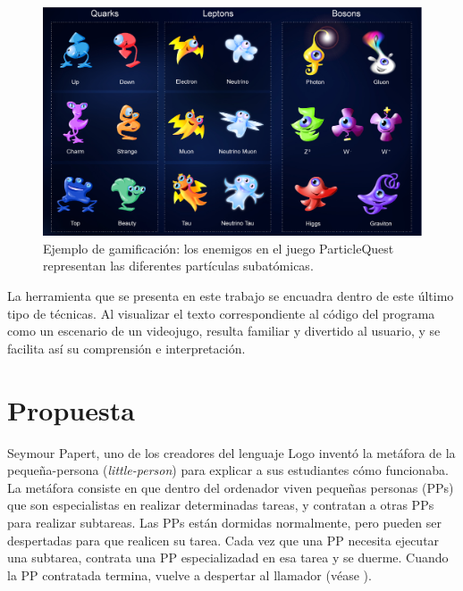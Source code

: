 \documentclass{llncs}
\begin{document}
\begin{figure}[ht]
\begin{center}
\includegraphics[scale=0.3]{images/particlequest.eps}
\caption{Ejemplo de gamificación: los enemigos en el juego ParticleQuest representan las diferentes partículas subatómicas.
\label{fig:particlequest}}
\end{center}
\end{figure}

La herramienta que se presenta en este trabajo se encuadra dentro de este último tipo de técnicas. Al visualizar el texto correspondiente al código del programa como un escenario de un videojugo, resulta familiar y divertido al usuario, y se facilita así su comprensión e interpretación.




\section{Propuesta}
\label{sec:proposal}

Seymour Papert, uno de los creadores del lenguaje Logo inventó la
metáfora de la pequeña-persona ({\em little-person}) para explicar a
sus estudiantes cómo funcionaba. La metáfora consiste en que dentro del ordenador viven pequeñas personas (PPs) que son especialistas en
realizar determinadas tareas, y contratan a otras PPs para realizar
subtareas. Las PPs están dormidas normalmente, pero pueden ser
despertadas para que realicen su tarea. Cada vez que una PP necesita
ejecutar una subtarea, contrata una PP especializadad en esa tarea y
se duerme. Cuando la PP contratada termina, vuelve a despertar al
llamador (véase \cite{harvey1985computer}).
\end{document}
